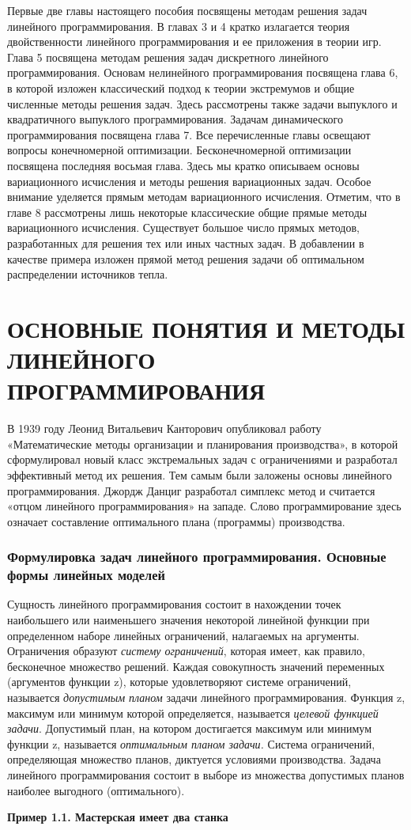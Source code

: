 	Первые две главы настоящего пособия посвящены методам решения задач линейного программирования. В главах 3 и 4 кратко излагается теория двойственности линейного программирования и ее приложения в теории игр. Глава 5 посвящена методам решения задач дискретного линейного программирования. Основам нелинейного программирования посвящена глава 6, в которой изложен классический подход к теории экстремумов и общие численные методы решения задач. Здесь рассмотрены также задачи выпуклого и квадратичного выпуклого программирования. Задачам динамического программирования посвящена глава 7. Все перечисленные главы освещают вопросы конечномерной оптимизации. Бесконечномерной оптимизации посвящена последняя восьмая глава. Здесь мы кратко описываем основы вариационного исчисления и методы решения вариационных задач. Особое внимание уделяется прямым методам вариационного исчисления. Отметим, что в главе 8 рассмотрены лишь некоторые классические общие прямые методы вариационного исчисления. Существует большое число прямых методов, разработанных для решения тех или иных частных задач. В добавлении в качестве примера изложен прямой метод решения задачи об оптимальном распределении источников тепла.

\chapter{ОСНОВНЫЕ ПОНЯТИЯ И МЕТОДЫ ЛИНЕЙНОГО ПРОГРАММИРОВАНИЯ}

В 1939 году Леонид Витальевич Канторович опубликовал работу «Математические методы организации и планирования производства», в которой сформулировал новый класс экстремальных задач с ограничениями и разработал эффективный метод их решения. Тем самым были заложены основы линейного программирования. Джордж Данциг разработал симплекс метод и считается «отцом линейного программирования» на западе. Слово программирование здесь означает составление оптимального плана (программы) производства.

\subsection{Формулировка задач линейного программирования. Основные формы линейных моделей}

Сущность линейного программирования состоит в нахождении точек наибольшего или наименьшего значения некоторой линейной функции при определенном наборе линейных ограничений, налагаемых на аргументы. Ограничения образуют \textit{систему ограничений}, которая имеет, как правило, бесконечное множество решений. Каждая совокупность значений переменных (аргументов функции z), которые удовлетворяют системе ограничений, называется \textit{допустимым планом} задачи линейного программирования. Функция z, максимум или минимум которой определяется, называется \textit{целевой функцией задачи}. Допустимый план, на котором достигается  максимум или минимум функции z, называется \textit{оптимальным планом задачи.} Система ограничений, определяющая множество планов, диктуется условиями производства. Задача линейного программирования состоит в выборе из множества допустимых планов наиболее выгодного (оптимального).

\bfseries{Пример 1.1.} Мастерская имеет два станка 


